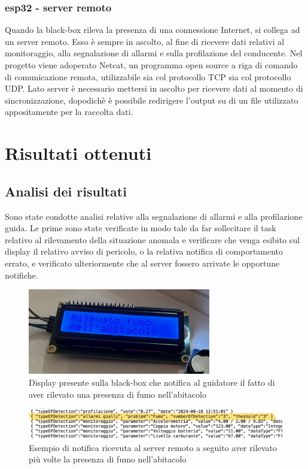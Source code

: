 \documentclass[12pt, a4paper, italian]{report}
\numberwithin{figure}{chapter}
\numberwithin{table}{chapter}
\begin{document}
\subsection{esp32 - server remoto}
Quando la black-box rileva la presenza di una connessione Internet, si collega ad un server remoto. Esso è sempre in ascolto, al fine di ricevere dati relativi al monitoraggio, alla segnalazione di allarmi e sulla profilazione del conducente. 
Nel progetto viene adoperato Netcat, un programma open source a riga di comando di comunicazione remota, utilizzabile sia col protocollo TCP sia col protocollo UDP. Lato server è necessario mettersi in ascolto per ricevere dati al momento di sincronizzazione, dopodichè è possibile redirigere l'output su di un file utilizzato appositamente per la raccolta dati. \cite{Netcat}

\chapter{Risultati ottenuti}
\section{Analisi dei risultati}
Sono state condotte analisi relative alla segnalazione di allarmi e alla profilazione guida. Le prime sono state verificate in modo tale da far sollecitare il task relativo al rilevamento della situazione anomala e verificare che venga esibito sul display il relativo avviso di pericolo, o la relativa notifica di comportamento errato, e verificato ulteriormente che al server fossero arrivate le opportune notifiche. 

\begin{figure}[h]
  \centering
  \includegraphics[width=8cm]{fumoLCD.png}
  \caption{Display presente sulla black-box che notifica al guidatore il fatto di aver rilevato una presenza di fumo nell'abitacolo}
  \label{fig:fumoLCD}
\end{figure}

\begin{figure}[h]
  \centering
  \includegraphics[width=14cm]{fumoServer.jpg}
  \caption{Esempio di notifica ricevuta al server remoto a seguito aver rilevato più volte la presenza di fumo nell'abitacolo}
  \label{fig:fumoServer}
\end{figure}
\end{document}
